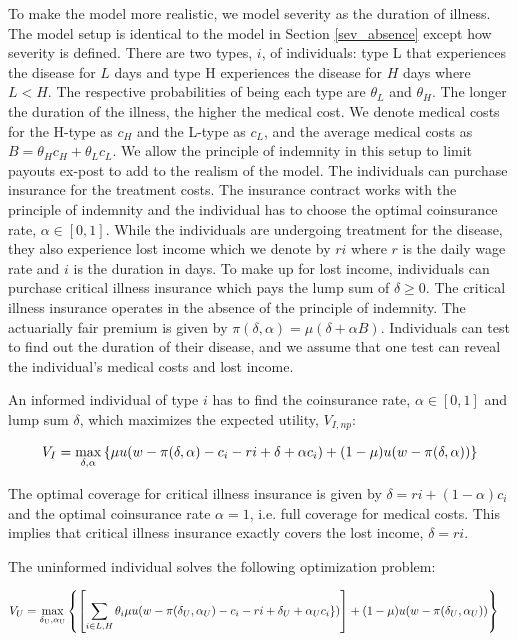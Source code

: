 \documentclass[nonatbib,preprint,12pt]{elsarticle}
\theoremstyle{plain}
\theoremstyle{definition}
\theoremstyle{plain}
\theoremstyle{TheoremNum}
\theoremstyle{CorollaryNum}
\theoremstyle{PropositionNum}
\theoremstyle{TheoremNum}
\begin{document}
To make the model more realistic, we model severity as the duration of illness. The model setup is identical to the model in Section \ref{sev_absence} except how severity is defined. There are two types, $i$, of individuals: type L that experiences the disease for $L$ days and type H experiences the disease for $H$ days where $L<H$. The respective probabilities of being each type are $\theta_L$ and $\theta_H$. The longer the duration of the illness, the higher the medical cost. We denote medical costs for the H-type as $c_H$ and the L-type as $c_L$, and the average medical costs as $B = \theta_H c_H + \theta_L c_L$. We allow the principle of indemnity in this setup to limit payouts ex-post to add to the realism of the model. The individuals can purchase insurance for the treatment costs. The insurance contract works with the principle of indemnity and the individual has to choose the optimal coinsurance rate, $\alpha \in [0,1]$. While the individuals are undergoing treatment for the disease, they also experience lost income which we denote by $ri$ where $r$ is the daily wage rate and $i$ is the duration in days. To make up for lost income, individuals can purchase critical illness insurance which pays the lump sum of $\delta \geq 0$. The critical illness insurance operates in the absence of the principle of indemnity. The actuarially fair premium is given by $\pi(\delta,\alpha) = \mu(\delta + \alpha B)$. Individuals can test to find out the duration of their disease, and we assume that one test can reveal the individual's medical costs and lost income.  

An informed individual of type $i$ has to find the coinsurance rate, $\alpha \in [0,1]$ and lump sum $\delta$, which maximizes the expected utility, $V_{I,np}$:

\begin{align}
    V_{I} = \underset{\rm \delta, \alpha}{\rm max} \left\{\mu u(w-\pi(\delta, \alpha)-c_i-ri+\delta + \alpha c_i )+(1-\mu)u(w-\pi(\delta,\alpha))\right\}
\label{informed_combined_maxproblem}
\end{align}

The optimal coverage for critical illness insurance is given by $\delta = ri + (1-\alpha)c_i$ and the optimal coinsurance rate $\alpha =1$, i.e. full coverage for medical costs. This implies that critical illness insurance exactly covers the lost income, $\delta = ri$. 

The uninformed individual solves the following optimization problem:

\begin{align}
V_{U} = \underset{\rm \delta_U, \alpha_U}{\rm max } & \left\{\left[\sum_{i \in {L,H}} \theta_i \mu u(w-\pi(\delta_U,\alpha_U)-c_i- ri+\delta_U + \alpha_U c_i\})\right] + (1-\mu)u(w-\pi(\delta_U,\alpha_U))\right\}
\label{uninformed_combined_maxproblem}
\end{align}
\end{document}
